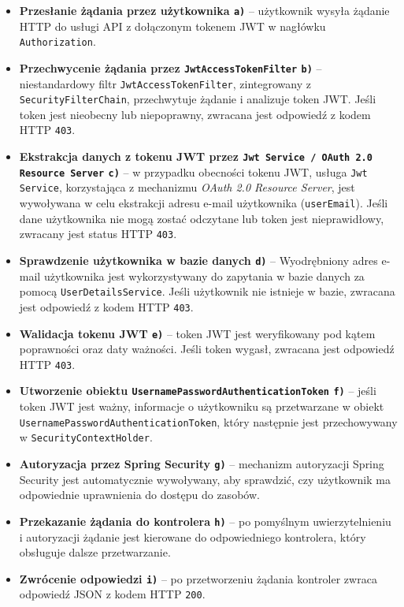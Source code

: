 \begin{itemize}
    \item \textbf{Przesłanie żądania przez użytkownika \texttt{a)}} -- użytkownik wysyła żądanie HTTP do usługi API z dołączonym tokenem JWT w nagłówku \texttt{Authorization}.
    
    \item \textbf{Przechwycenie żądania przez \texttt{JwtAccessTokenFilter} \texttt{b)}} -- niestandardowy filtr \texttt{JwtAccessTokenFilter}, zintegrowany z \texttt{SecurityFilterChain}, przechwytuje żądanie i analizuje token JWT. Jeśli token jest nieobecny lub niepoprawny, zwracana jest odpowiedź z kodem HTTP \texttt{403}.
    
    \item \textbf{Ekstrakcja danych z tokenu JWT przez \texttt{Jwt Service / OAuth 2.0 Resource Server} \texttt{c)}} -- w przypadku obecności tokenu JWT, usługa \texttt{Jwt Service}, korzystająca z mechanizmu \emph{OAuth 2.0 Resource Server}, jest wywoływana w celu ekstrakcji adresu e-mail użytkownika (\texttt{userEmail}). Jeśli dane użytkownika nie mogą zostać odczytane lub token jest nieprawidłowy, zwracany jest status HTTP \texttt{403}.

    \item \textbf{Sprawdzenie użytkownika w bazie danych \texttt{d)}} -- Wyodrębniony adres e-mail użytkownika jest wykorzystywany do zapytania w bazie danych za pomocą \texttt{UserDetailsService}. Jeśli użytkownik nie istnieje w bazie, zwracana jest odpowiedź z kodem HTTP \texttt{403}.
    
    \item \textbf{Walidacja tokenu JWT \texttt{e)}} -- token JWT jest weryfikowany pod kątem poprawności oraz daty ważności. Jeśli token wygasł, zwracana jest odpowiedź HTTP \texttt{403}.
    
    \item \textbf{Utworzenie obiektu \texttt{UsernamePasswordAuthenticationToken} \texttt{f)}} -- jeśli token JWT jest ważny, informacje o użytkowniku są przetwarzane w obiekt \texttt{UsernamePasswordAuthenticationToken}, który następnie jest przechowywany w \texttt{SecurityContextHolder}.
    
    \item \textbf{Autoryzacja przez Spring Security \texttt{g)}} -- mechanizm autoryzacji Spring Security jest automatycznie wywoływany, aby sprawdzić, czy użytkownik ma odpowiednie uprawnienia do dostępu do zasobów.
    
    \item \textbf{Przekazanie żądania do kontrolera \texttt{h)}} -- po pomyślnym uwierzytelnieniu i autoryzacji żądanie jest kierowane do odpowiedniego kontrolera, który obsługuje dalsze przetwarzanie.
    
    \item \textbf{Zwrócenie odpowiedzi \texttt{i)}} -- po przetworzeniu żądania kontroler zwraca odpowiedź JSON z kodem HTTP \texttt{200}.
\end{itemize}

